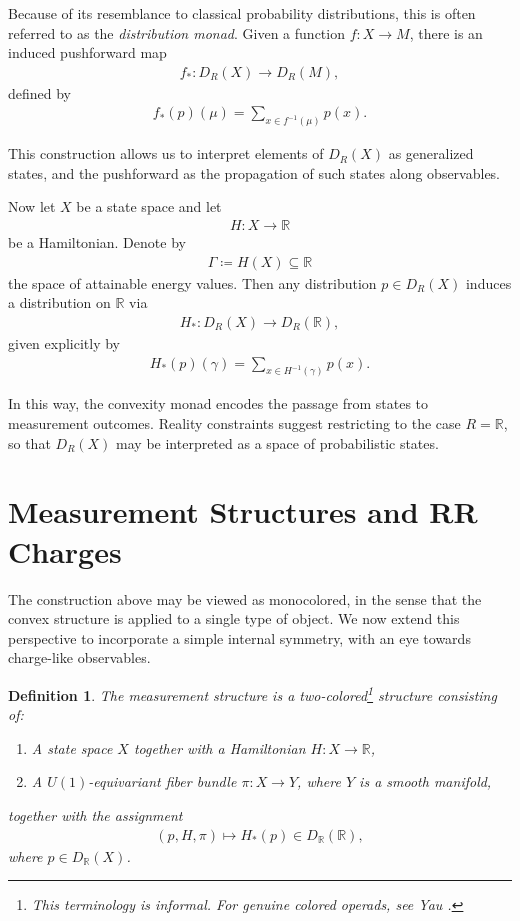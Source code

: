 \documentclass{article}
\newtheorem{dn}{Definition}
\numberwithin{tm}{section}
\numberwithin{dn}{section}
\numberwithin{as}{section}
\numberwithin{rk}{section}
\numberwithin{lem}{section}
\numberwithin{ax}{section}
\numberwithin{pp}{section}
\numberwithin{eg}{section}
\numberwithin{war}{section}
\numberwithin{equation}{section}
\numberwithin{prop}{section}
\numberwithin{nt}{section}
\numberwithin{rc}{section}
\numberwithin{setup}{section}
\begin{document}
	Because of its resemblance to classical probability distributions, this is often referred to as the \emph{distribution monad}. Given a function $f: X \to M$, there is an induced pushforward map
	\begin{align}
		f_* : D_R(X) \longrightarrow D_R(M),
	\end{align}
	defined by
	\begin{align}
		f_*(p)(\mu) = \sum_{x \in f^{-1}(\mu)} p(x).
	\end{align}
	
	This construction allows us to interpret elements of $D_R(X)$ as generalized states, and the pushforward as the propagation of such states along observables.
	
	Now let $X$ be a state space and let
	\begin{align}
		H: X \longrightarrow \mathbb{R}
	\end{align}
	be a Hamiltonian. Denote by
	\begin{align}
		\Gamma \coloneq H(X) \subseteq \mathbb{R}
	\end{align}
	the space of attainable energy values. Then any distribution $p \in D_R(X)$ induces a distribution on $\mathbb{R}$ via
	\begin{align}
		H_* : D_R(X) \longrightarrow D_R(\mathbb{R}),
	\end{align}
	given explicitly by
	\begin{align}
		H_*(p)(\gamma) = \sum_{x \in H^{-1}(\gamma)} p(x).
	\end{align}
	
	In this way, the convexity monad encodes the passage from states to measurement outcomes. Reality constraints \cite{Smooth} suggest restricting to the case $R = \mathbb{R}$, so that $D_R(X)$ may be interpreted as a space of probabilistic states.
	
\section{Measurement Structures and RR Charges}

The construction above may be viewed as monocolored, in the sense that the convex structure is applied to a single type of object. We now extend this perspective to incorporate a simple internal symmetry, with an eye towards charge-like observables.

\begin{dn} \label{measurement structure}
	The \emph{measurement structure} is a two-colored\footnote{This terminology is informal. For genuine colored operads, see Yau \cite{Yau}.} structure consisting of:
	\begin{enumerate}
		\item A state space $X$ together with a Hamiltonian $H: X \to \mathbb{R}$,
		\item A $U(1)$-equivariant fiber bundle $\pi: X \to Y$, where $Y$ is a smooth manifold,
	\end{enumerate}
	together with the assignment
	\begin{align}
		(p,H,\pi) \longmapsto H_*(p) \in D_{\mathbb{R}}(\mathbb{R}),
	\end{align}
	where $p \in D_{\mathbb{R}}(X)$.
\end{dn}
\end{document}

